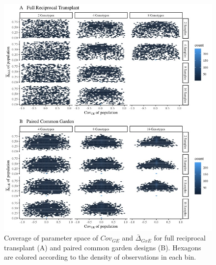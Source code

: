 \documentclass[11pt, oneside]{amsart}
\begin{document}
\renewcommand\thefigure{S2}
\begin{figure}[h]
\begin{center}
\includegraphics[width=6in]{Figs/HexPlot.jpeg}
\end{center}
\label{Fig: Parameter Coverage}
\caption[Coverage of parameter space of $Cov_{GE}$ and $\bar\Delta_{GxE}$ for full reciprocal transplant (A) and paired common garden designs (B).]{Coverage of parameter space of $Cov_{GE}$ and $\bar\Delta_{GxE}$ for full reciprocal transplant (A) and paired common garden designs (B). Hexagons are colored according to the density of observations in each bin. }
\end{figure}

\clearpage
\newpage
\end{document}
